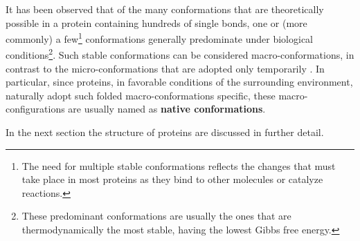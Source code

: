 It has been observed that of the many conformations that are theoretically possible in a protein containing hundreds of single bonds, one or (more commonly) a few\footnote{The need for multiple stable conformations reflects the changes that must take place in most proteins as they bind to other molecules or catalyze reactions.} conformations generally predominate under biological conditions\footnote{These predominant conformations are usually the ones that are thermodynamically the most stable, having the lowest Gibbs free energy.}. Such stable conformations can be considered macro-conformations, in contrast to the micro-conformations that are adopted only temporarily
\cite{creighton2010biophysical}.
In particular, since proteins, in favorable conditions of the surrounding environment, naturally adopt such folded macro-conformations specific, these macro-configurations are usually named as \textbf{native conformations}. %




In the next section the structure of proteins are discussed in further detail.

